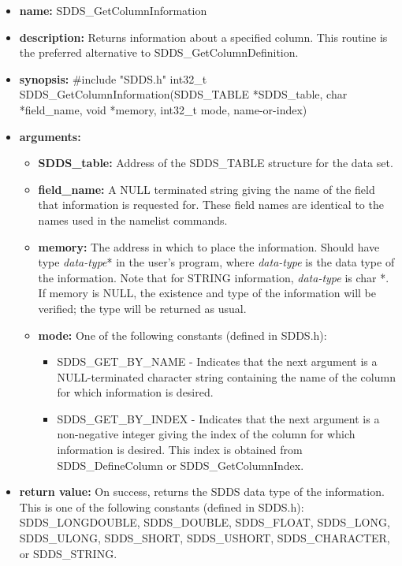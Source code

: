 \documentclass[11pt]{article}
\begin{document}
\begin{itemize}
\item {\bf name:}\newline
SDDS\_GetColumnInformation
\item {\bf description:}\newline
Returns information about a specified column. This routine is the preferred alternative to SDDS\_GetColumnDefinition.
\item {\bf synopsis:} \#include "SDDS.h"\newline
int32\_t SDDS\_GetColumnInformation(SDDS\_TABLE *SDDS\_table, char *field\_name, void *memory, int32\_t mode,  name-or-index)
\item {\bf arguments:}
\begin{itemize}
\item {\bf SDDS\_table:} Address of the SDDS\_TABLE structure for the data set.
\item {\bf field\_name:} A NULL terminated string giving the name of the field that information is requested for. These field names are identical to the names used in the namelist commands.
\item {\bf memory:} The address in which to place the information. Should have type {\em data-type}* in the user's program, where {\em data-type} is the data type of the information. Note that for STRING information, {\em data-type} is char *. If memory is NULL, the existence and type of the information will be verified; the type will be returned as usual.
\item {\bf mode:} One of the following constants (defined in SDDS.h):
\begin{itemize}
\item SDDS\_GET\_BY\_NAME -  Indicates that the next argument is a NULL-terminated character string containing the name of the column for which information is desired.
\item SDDS\_GET\_BY\_INDEX - Indicates that the next argument is a non-negative integer giving the index of the column for which information is desired. This index is obtained from SDDS\_DefineColumn or SDDS\_GetColumnIndex.
\end{itemize}
\end{itemize}
\item {\bf return value:}\newline
On success, returns the SDDS data type of the information. This is one of the following constants (defined in SDDS.h): SDDS\_LONGDOUBLE, SDDS\_DOUBLE, SDDS\_FLOAT, SDDS\_LONG, SDDS\_ULONG, SDDS\_SHORT, SDDS\_USHORT, SDDS\_CHARACTER, or SDDS\_STRING.\newline

\end{itemize}
\end{document}
